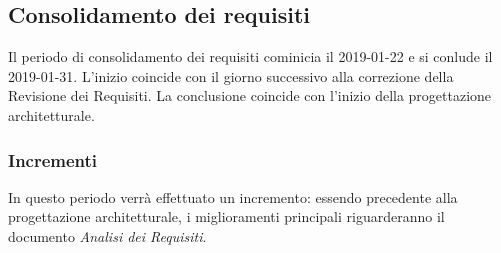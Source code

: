 \subsection{Consolidamento dei requisiti}
Il periodo di consolidamento dei requisiti cominicia il 2019-01-22 e si conlude il 2019-01-31. L'inizio coincide con il giorno successivo alla correzione della Revisione dei Requisiti. La conclusione coincide con l'inizio della progettazione architetturale. 
\subsubsection{Incrementi}
In questo periodo verrà effettuato un incremento: essendo precedente alla progettazione architetturale, i miglioramenti principali riguarderanno il documento \emph{Analisi dei Requisiti}.

\pagebreak
